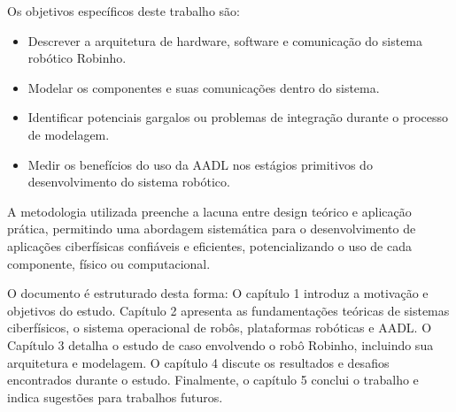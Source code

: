 Os objetivos específicos deste trabalho são:
\begin{itemize}
    \item Descrever a arquitetura de hardware, software e comunicação do sistema robótico Robinho.
    \item Modelar os componentes e suas comunicações dentro do sistema.
    \item Identificar potenciais gargalos ou problemas de integração durante o processo de modelagem.
    \item Medir os benefícios do uso da AADL nos estágios primitivos do desenvolvimento do sistema robótico.
\end{itemize}

A metodologia utilizada preenche a lacuna entre design teórico e aplicação prática, permitindo uma abordagem sistemática para o desenvolvimento de aplicações ciberfísicas confiáveis e eficientes, potencializando o uso de cada componente, físico ou computacional.

O documento é estruturado desta forma: O capítulo 1 introduz a motivação e objetivos do estudo. Capítulo 2 apresenta as fundamentações teóricas de sistemas ciberfísicos, o sistema operacional de robôs, plataformas robóticas e AADL. O Capítulo 3 detalha o estudo de caso envolvendo o robô Robinho, incluindo sua arquitetura e modelagem. O capítulo 4 discute os resultados e desafios encontrados durante o estudo. Finalmente, o capítulo 5 conclui o trabalho e indica sugestões para trabalhos futuros.